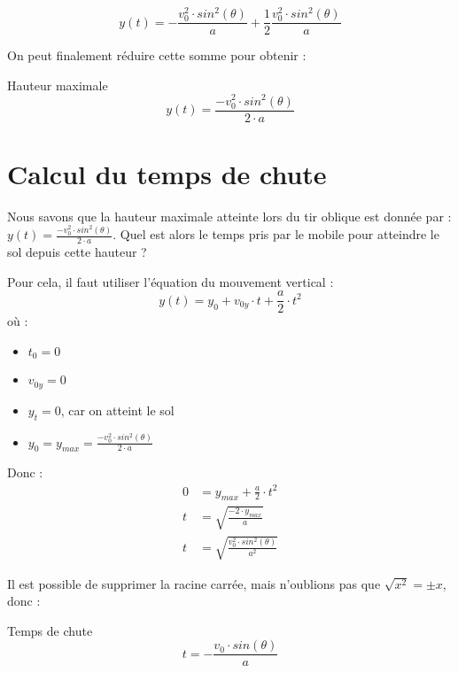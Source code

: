 \begin{equation}
    y(t)=- \frac{v_0^2 \cdot sin^2(\theta)}{a} + \frac{1}{2} \frac{v_0^2 \cdot sin^2(\theta)}{a}
\end{equation}

On peut finalement réduire cette somme pour obtenir :

\begin{encadre_equation*}{Hauteur maximale}
    \begin{equation}
        y(t)=\frac{-v_0^2 \cdot sin^2(\theta)}{2 \cdot a}
    \end{equation}
\end{encadre_equation*}

\newpage

\section{Calcul du temps de chute}
Nous savons que la hauteur maximale atteinte lors du tir oblique est donnée par : \(y(t)=\frac{-v_0^2 \cdot sin^2(\theta)}{2 \cdot a}\). Quel est alors le temps pris par le mobile pour atteindre le sol depuis cette hauteur ?

Pour cela, il faut utiliser l'équation du mouvement vertical :
\begin{equation}
    y(t)=y_0 + v_{0y} \cdot t + \frac{a}{2} \cdot t^2
\end{equation} où :

\begin{itemize}[label=\textbullet]
    \item \(t_0=0\)
    \item \(v_{0y}=0\)
    \item \(y_t=0\), car on atteint le sol
    \item \(y_0=y_{max}=\frac{-v_0^2 \cdot sin^2(\theta)}{2 \cdot a}\)
\end{itemize}

Donc :
\begin{align}
    0 & =y_{max}+\frac{a}{2} \cdot t^2                 \\
    t & =\sqrt{\frac{-2 \cdot y_{max}}{a}}             \\
    t & =\sqrt{\frac{v_0^2 \cdot sin^2 (\theta)}{a^2}}
\end{align}

Il est possible de supprimer la racine carrée, mais n'oublions pas que \(\sqrt{x^2}=\pm x\), donc :
\begin{encadre_equation*}{Temps de chute}
    \begin{equation}
        t=-\frac{v_0 \cdot sin(\theta)}{a}
    \end{equation}
\end{encadre_equation*}

